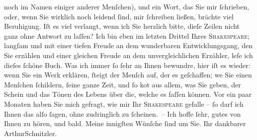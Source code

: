 \begin{ledgroupsized}[t]{13cm}
                    noch im Namen einiger anderer Menſchen), und ein Wort, das Sie mir ſchrieben,
                    oder, wenn Sie wirklich noch lei{\pb}dend
                    ſind, mir ſchreiben ließen, brächte viel Beruhigung. Iſt es viel verlangt, wenn
                    ich Sie herzlich bitte, dieſe Zeilen nicht ganz ohne Antwort zu laſſen?\pend
           \pstart
           Ich \introOben{}bin\introOben{} eben im letzten Drittel Ihres \textsc{Shakespeare}; langſam und mit einer tiefen Freude an dem wunderbaren {\pb}Entwicklungsgang, den Sie erzählen und
                    einer gleichen Freude an dem unvergleichlichen Erzähler, leſe ich dieſes ſchöne
                    Buch. Was ich immer ſo ſehr an Ihnen bewundre, hier iſt es wieder: wenn Sie ein
                    Werk erklären, ſteigt der Menſch auf, der es geſchaffen; we{\geminationn}
               Sie einen Menſchen ſchildern, ſeine ganze Zeit,
                    und {\pb}ſo ko{\geminationm}t aus
                    allem, was Sie geben, der Schein und das Tönen des Lebens über die, welche es
                    faſſen können. Vor ein paar Monaten haben Sie mich gefragt, wie mir Ihr
                        \textsc{Shakespeare} gefalle – ſo darf ich Ihnen das alſo ſagen, ohne zudringlich zu
                    ſcheinen. –\pend
           \pstart Ich hoffe ſehr, gutes von Ihnen zu hören, und bald. Meine innigſten Wünſche
                    ſind um Sie. Ihr dankbarer \spacefill\mbox{ArthurSchnitzler.}\pend{}\endnumbering{}\end{ledgroupsized}  \newcommand{\dateiname}{L00696}\newcommand{\titel}{Arthur Schnitzler an Georg Brandes, 9. 7. 1897}\newcommand{\editorInnen}{Martin Anton Müller und Gerd-Hermann Susen}
      